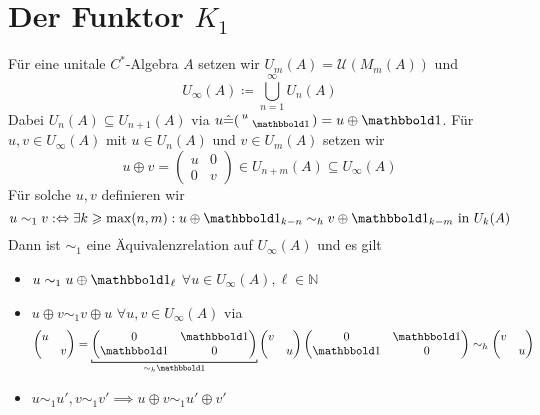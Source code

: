 \section{Der Funktor $K_1$} %
\label{sec:8}

\begin{definitionP}[label=def:81]
	Für eine unitale $C^*$-Algebra $A$ setzen wir $U_m(A) = \mathcal{U}(M_m(A))$ und
	\[
		U_\infty(A) \coloneqq \bigcup_{n=1}^\infty U_n(A)
	\]
	Dabei $U_n(A) \subseteq U_{n+1}(A)$ via $u \hat{=} \begin{psmallmatrix}
		u & \\ & \ind 
	\end{psmallmatrix} = u \oplus \ind$.
	Für $u,v \in U_\infty(A)$ mit $u \in U_n(A)$ und $v \in U_m(A)$ setzen wir 
	\[
		u \oplus v = \begin{pmatrix}
			u & 0 \\
			0 & v
		\end{pmatrix} \in U_{n+m}(A) \subseteq U_\infty(A)
	\]
	Für solche $u,v$ definieren wir
	\[
		u \sim_1 v :\Leftrightarrow \exists k \ge \max(n,m) : u \oplus \ind_{k-n} \sim_h v \oplus \ind_{k-m} \text{ in } U_k(A) 
	\]
	Dann ist $\sim_1$ eine Äquivalenzrelation auf $U_\infty(A)$ und es gilt 
	\begin{itemize}
		\item $u \sim_1 u \oplus \ind_\ell$ $\forall u \in U_\infty(A), \ell \in \mathbb{N}$
		\item $u \oplus v \sim_1 v \oplus u$ $\forall u,v \in U_\infty(A)$ via
		\[
			\begin{pmatrix}
				u & \\ & v
			\end{pmatrix} = \Underbracket{\begin{pmatrix}
				0 & \ind \\
				\ind & 0
			\end{pmatrix}}{\sim_h \ind}
			\begin{pmatrix}
				v & \\ & u
			\end{pmatrix}
			\begin{pmatrix}
				0 & \ind \\ \ind & 0
			\end{pmatrix}
			\sim_h \begin{pmatrix}
				v & \\ & u
			\end{pmatrix}
		\]
		\item $u \sim_1 u' , v \sim_1 v' \implies u \oplus v \sim_1 u' \oplus v'$

\end{itemize}
\end{definitionP}
